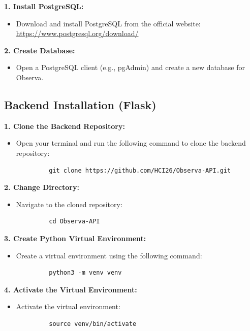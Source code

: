 \documentclass[a4 paper, 12pt]{article}
\begin{document}
\textbf{1. Install PostgreSQL:}
   \begin{itemize}
      \item Download and install PostgreSQL from the official website: \url{https://www.postgresql.org/download/}
   \end{itemize}

\textbf{2. Create Database:}
   \begin{itemize}
      \item Open a PostgreSQL client (e.g., pgAdmin) and create a new database for Observa.
   \end{itemize}


\subsection{Backend Installation (Flask)}

\textbf{1. Clone the Backend Repository:}
   \begin{itemize}
      \item Open your terminal and run the following command to clone the backend repository:
         \begin{verbatim}
         git clone https://github.com/HCI26/Observa-API.git
         \end{verbatim}
   \end{itemize}

\textbf{2. Change Directory:}
   \begin{itemize}
      \item Navigate to the cloned repository:
         \begin{verbatim}
         cd Observa-API
         \end{verbatim}
   \end{itemize}

\textbf{3. Create Python Virtual Environment:}
   \begin{itemize}
      \item Create a virtual environment using the following command:
         \begin{verbatim}
         python3 -m venv venv
         \end{verbatim}
   \end{itemize}

\textbf{4. Activate the Virtual Environment:}
   \begin{itemize}
      \item Activate the virtual environment:
         \begin{verbatim}
         source venv/bin/activate
         \end{verbatim}
   \end{itemize}
\end{document}
